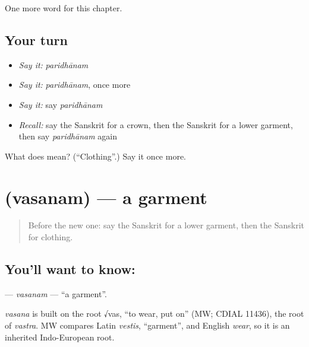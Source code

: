 \begin{grammarlens}[title={What you've built}]
One more word for this chapter.
\end{grammarlens}

\subsection*{Your turn}
\begin{itemize}
\raggedright
  \item \emph{Say it:} \emph{paridhānam}
  \item \emph{Say it:} \emph{paridhānam}, once more
  \item \emph{Say it:} say \emph{paridhānam}
  \item \emph{Recall:} say the Sanskrit for a crown, then the Sanskrit for a lower garment, then say \emph{paridhānam} again
\end{itemize}

\begin{tcolorbox}[breakable,colback=teal!4,colframe=teal!35!black,title={Before you move on}]
What does  mean? (\textquotedblleft{}Clothing\textquotedblright{}.) Say it once more.
\end{tcolorbox}
\section[\texorpdfstring{\sk{वसनम्} (vasanam)}{वसनम् (vasanam)}]{ (vasanam) — a garment}

\label{lesson:SA-C192-vasanam}



\begin{quote}
Before the new one: say the Sanskrit for a lower garment, then the Sanskrit for clothing.
\end{quote}

\subsection*{You'll want to know: }
\textbf{} — \emph{vasanam} — \textquotedblleft{}a garment\textquotedblright{}.

\begin{cousinweb}
\emph{vasana} is built on the root √vas, \textquotedblleft{}to wear, put on\textquotedblright{} (MW; CDIAL 11436), the root of \emph{vastra}. MW compares Latin \emph{vestis}, \textquotedblleft{}garment\textquotedblright{}, and English \emph{wear}, so it is an inherited Indo-European root.
\end{cousinweb}

